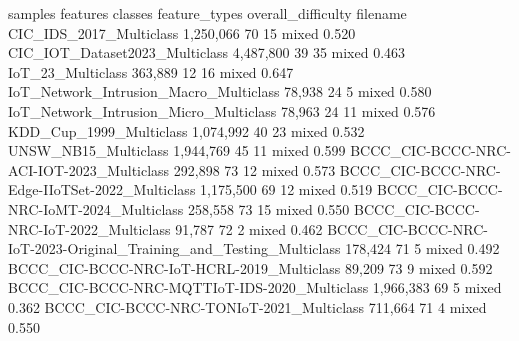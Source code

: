                                                                         samples features classes feature_types                          overall_difficulty
filename                                                                                                                                                  
CIC_IDS_2017_Multiclass                                               1,250,066       70      15         mixed   0.520
CIC_IOT_Dataset2023_Multiclass                                        4,487,800       39      35         mixed   0.463
IoT_23_Multiclass                                                       363,889       12      16         mixed   0.647
IoT_Network_Intrusion_Macro_Multiclass                                   78,938       24       5         mixed   0.580
IoT_Network_Intrusion_Micro_Multiclass                                   78,963       24      11         mixed   0.576
KDD_Cup_1999_Multiclass                                               1,074,992       40      23         mixed   0.532
UNSW_NB15_Multiclass                                                  1,944,769       45      11         mixed   0.599
BCCC_CIC-BCCC-NRC-ACI-IOT-2023_Multiclass                               292,898       73      12         mixed   0.573
BCCC_CIC-BCCC-NRC-Edge-IIoTSet-2022_Multiclass                        1,175,500       69      12         mixed   0.519
BCCC_CIC-BCCC-NRC-IoMT-2024_Multiclass                                  258,558       73      15         mixed   0.550
BCCC_CIC-BCCC-NRC-IoT-2022_Multiclass                                    91,787       72       2         mixed   0.462
BCCC_CIC-BCCC-NRC-IoT-2023-Original_Training_and_Testing_Multiclass     178,424       71       5         mixed   0.492
BCCC_CIC-BCCC-NRC-IoT-HCRL-2019_Multiclass                               89,209       73       9         mixed   0.592
BCCC_CIC-BCCC-NRC-MQTTIoT-IDS-2020_Multiclass                         1,966,383       69       5         mixed   0.362
BCCC_CIC-BCCC-NRC-TONIoT-2021_Multiclass                                711,664       71       4         mixed   0.550

